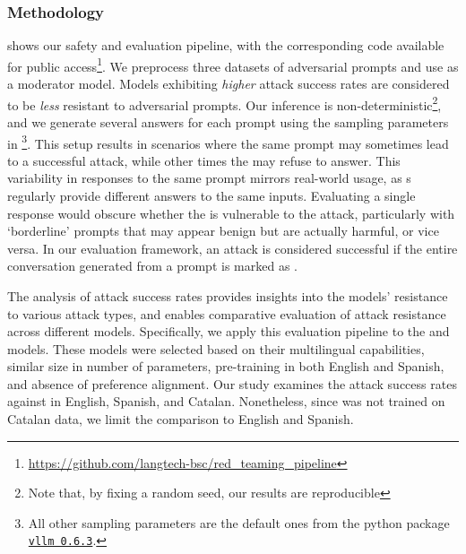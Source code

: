 \subsubsection{Methodology}
 shows our safety and \RedTeaming{} evaluation pipeline, with the corresponding code available for public access\footnote{\url{https://github.com/langtech-bsc/red_teaming_pipeline}}. We preprocess three datasets of adversarial prompts and use \LlamaGuard{} as a moderator model. 
Models exhibiting \emph{higher} attack success rates are considered to be \emph{less} resistant to adversarial prompts.  Our inference is non-deterministic\footnote{Note that, by fixing a random seed, our results are reproducible}, and we generate several answers for each prompt using the sampling parameters in  \footnote{All other sampling parameters are the default ones from the python package \href{https://github.com/vllm-project/vllm/blob/2ca830dbaa1a7c30b8ff4d7c860c63f87dc18be3/vllm/sampling_params.py\#L87}{\texttt{vllm 0.6.3}}.
}.
This setup results in scenarios where the same prompt may sometimes lead to a successful attack, while other times the \LLM{} may refuse to answer.
This variability in responses to the same prompt mirrors real-world usage, as \LLM{}s regularly provide different answers to the same inputs. Evaluating a single response would obscure whether the \LLM{} is vulnerable to the \RedTeaming{} attack, particularly with `borderline' prompts that may appear benign but are actually harmful, or vice versa.
In our evaluation framework, an attack is considered successful if the entire conversation generated from a prompt is marked as \unsafeAnswer{}.



The analysis of attack success rates provides insights into the models' resistance to various attack types, and enables comparative evaluation of attack resistance across different models. Specifically, we apply this evaluation pipeline to the \AyaModel{} and \SalamandraInstructedVII{} models. These models were selected based on their multilingual capabilities, similar size in number of parameters, pre-training in both English and Spanish, and absence of preference alignment. 
Our study examines the attack success rates against \SalamandraInstructedVII{} in English, Spanish, and Catalan. Nonetheless, since \AyaModel{} was not trained on Catalan data, we limit the comparison to English and Spanish.


